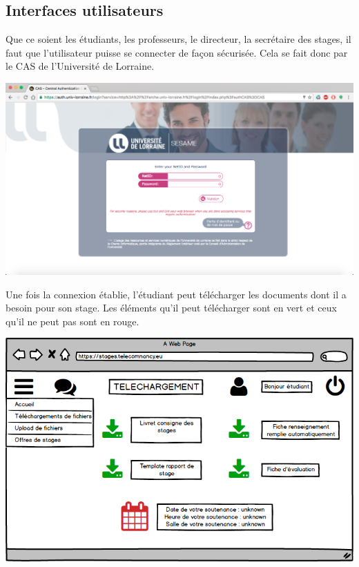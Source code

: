 \documentclass{scrreprt}
\begin{document}
\subsection{Interfaces utilisateurs}
\hspace{1cm}Que ce soient les étudiants, les professeurs, le directeur, la secrétaire des stages, il faut que l'utilisateur puisse se connecter de façon sécurisée. Cela se fait donc par le CAS de l'Université de Lorraine.
\vspace{0.5cm}
\begin{center}
\centerline{\includegraphics[scale=0.4]{image/CAS.png}}
\end{center}
\vspace{2,5cm}
\begin{flushleft}
\hspace{1cm}Une fois la connexion établie, l'étudiant peut télécharger les documents dont il a besoin pour son stage. Les éléments qu'il peut télécharger sont en vert et ceux qu'il ne peut pas sont en rouge.
\end{flushleft}
\begin{center}
\centerline{\includegraphics[scale=0.65]{image/DownloadEleve.png}}
\end{center}
\end{document}
